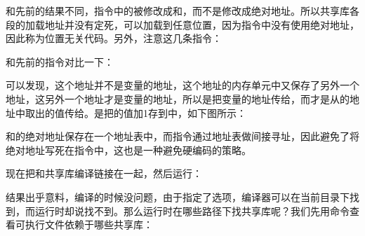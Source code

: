 

和先前的结果不同，指令中的被修改成和，而不是修改成绝对地址。所以共享库各段的加载地址并没有定死，可以加载到任意位置，因为指令中没有使用绝对地址，因此称为位置无关代码。另外，注意这几条指令：




和先前的指令对比一下：




可以发现，这个地址并不是变量的地址，这个地址的内存单元中又保存了另外一个地址，这另外一个地址才是变量的地址，所以是把变量的地址传给，而才是从的地址中取出的值传给。是把的值加1存到中，如下图所示：




和的绝对地址保存在一个地址表中，而指令通过地址表做间接寻址，因此避免了将绝对地址写死在指令中，这也是一种避免硬编码的策略。



现在把和共享库编译链接在一起，然后运行：




结果出乎意料，编译的时候没问题，由于指定了选项，编译器可以在当前目录下找到，而运行时却说找不到。那么运行时在哪些路径下找共享库呢？我们先用命令查看可执行文件依赖于哪些共享库：




